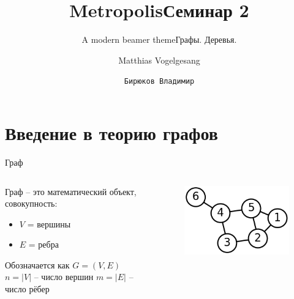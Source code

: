 \documentclass[10pt]{beamer}
\title{Metropolis}
\subtitle{A modern beamer theme}
\date{}
\author{Matthias Vogelgesang}
\institute{Center for modern beamer themes}
\title{Семинар 2}
\subtitle{Графы. Деревья.}
\author{\texttt{Бирюков Владимир}}
\institute{МФТИ}
\begin{document}
%
%

\maketitle


%
%

\section{Введение в теорию графов}



\begin{frame}{Граф}
\begin{columns}
\begin{column}{.48\linewidth}
Граф -- это математический объект, совокупность:
\begin{itemize}
\item $V$ = вершины
\item $E$ = ребра
\end{itemize}
Обозначается как $G = (V, E)$ \\
$n = |V|$ -- число вершин
$m = |E|$ -- число рёбер
\end{column}
\begin{column}{.48\linewidth}
		\begin{figure}
		\centerline{\includegraphics[width=1.0\linewidth]{images/graph1.png}}
		\end{figure}
	\end{column}
\end{columns}
\end{frame}
\end{document}
